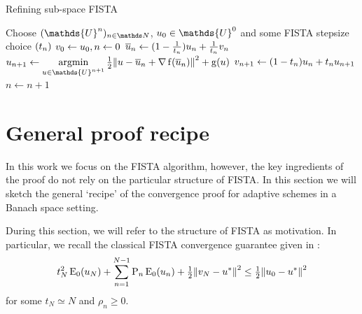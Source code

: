 \documentclass[10pt,a4paper,onecolumn]{article} \usepackage[latin1]{inputenc}
\numberwithin{equation}{section}
\let\F\mathds\let\C\mathcal\newcommand{\R}{\F{R}}\newcommand{\A}{\C{A}}
\newcommand{\norm}[1]{{\left\lVert #1 \right\rVert}}
\newcommand{\op}[1]{\operatorname{#1}}\newcommand{\overtext}[2]{\stackrel{\text{#1}}{#2}}
\renewcommand{\bar}{\overline}\renewcommand{\hat}{\widehat}\renewcommand{\tilde}{\widetilde}
\DeclareMathOperator*{\argmin}{argmin}\DeclareMathOperator{\TV}{TV}
\newcommand*{\Func}[1]{%
	\IfEqCase{#1}{%
		{0}{\op{E}}%
		{1}{\op{F}}%
		{2}{\op{G}}%
		{3}{\op{H}}%
	}[\op{F}#1]%
}
\newcommand*{\func}[1]{%
	\IfEqCase{#1}{%
		{0}{\op{e}}%
		{1}{\op{f}}%
		{2}{\op{g}}%
		{3}{\op{h}}%
	}[\op{f}#1]%
}
\newcommand*{\varf}[1]{%
	\IfEqCase{#1}{%
		{0}{u}%
		{1}{v}%
		{2}{w}%
	}[u#1]%
}
\newcommand*{\spcf}[1]{%
	\IfEqCase{#1}{%
		{0}{\F{U}}%
		{1}{\F{V}}%
		{2}{\F{W}}%
	}[\F{U}#1]%
}
\newcommand*{\vart}[1]{%
	\IfEqCase{#1}{%
		{0}{s}%
		{1}{t}%
	}[t#1]%
}
\begin{document}
\begin{algorithm}[b!]\caption{Refining sub-space FISTA}\label{alg:ca: refining FISTA}
	\centering
	\begin{algorithmic}[1]
		\State Choose $(\spcf0^n)_{n\in\F N}$, $\varf0_0\in \spcf0^0$ and some FISTA stepsize choice $(\vart1_n)$
		\State $\varf1_0\gets \varf0_0, n\gets0$
		\Repeat
		\State $\bar{\varf0}_n \gets (1-\tfrac{1}{\vart1_n})\varf0_n + \tfrac{1}{\vart1_n}\varf1_n$
		\State $\displaystyle \varf0_{n+1} \gets \argmin_{\varf0\in \spcf0^{n+1}} \tfrac12\norm{\varf0-\bar{\varf0}_n+\nabla \func1(\bar{\varf0}_n)}^2+\func2(\varf0)$
		\State $\varf1_{n+1} \gets (1-\vart1_n)\varf0_n + \vart1_n\varf0_{n+1}$
		\State $n\gets n+1$
	\end{algorithmic}
\end{algorithm}


\section{General proof recipe}\label{sec:ca: recipe}
In this work we focus on the FISTA algorithm, however, the key ingredients of the proof do not rely on the particular structure of FISTA. In this section we will sketch the general `recipe' of the convergence proof for adaptive schemes in a Banach space setting.

During this section, we will refer to the structure of FISTA as motivation. In particular, we recall the classical FISTA convergence guarantee given in \cite[Theorem 2]{Chambolle2015}:
\begin{equation}\label{eq:ca: classical FISTA}
	t_N^2\Func0_0(\varf0_N) + \sum^{N-1}_{n=1}\rho_n\Func0_0(\varf0_n) + \tfrac12\norm{\varf1_N-\varf0^*}^2 \leq \tfrac12\norm{\varf0_0-\varf0^*}^2
\end{equation}
for some $t_N\simeq N$ and $\rho_n\geq0$.
\end{document}

